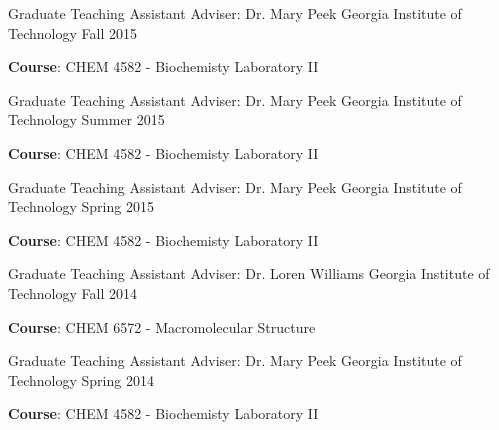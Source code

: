 \begin{cventries}
  \cventry
    {Graduate Teaching Assistant} %
    {Adviser: Dr. Mary Peek} %
    {Georgia Institute of Technology} %
    {Fall 2015} %
    {
      \begin{cvitems} %
        \item {\textbf{Course}: CHEM 4582 - Biochemisty Laboratory II}
      \end{cvitems}
    }

  \cventry
    {Graduate Teaching Assistant} %
    {Adviser: Dr. Mary Peek} %
    {Georgia Institute of Technology} %
    {Summer 2015} %
    {
      \begin{cvitems} %
        \item {\textbf{Course}: CHEM 4582 - Biochemisty Laboratory II}
      \end{cvitems}
    }

  \cventry
    {Graduate Teaching Assistant} %
    {Adviser: Dr. Mary Peek} %
    {Georgia Institute of Technology} %
    {Spring 2015} %
    {
      \begin{cvitems} %
        \item {\textbf{Course}: CHEM 4582 - Biochemisty Laboratory II}
      \end{cvitems}
    }

  \cventry
    {Graduate Teaching Assistant} %
    {Adviser: Dr. Loren Williams} %
    {Georgia Institute of Technology} %
    {Fall 2014} %
    {
      \begin{cvitems} %
        \item {\textbf{Course}: CHEM 6572 - Macromolecular Structure}
      \end{cvitems}
    }

  \cventry
    {Graduate Teaching Assistant} %
    {Adviser: Dr. Mary Peek} %
    {Georgia Institute of Technology} %
    {Spring 2014} %
    {
      \begin{cvitems} %
        \item {\textbf{Course}: CHEM 4582 - Biochemisty Laboratory II}
      \end{cvitems}
    }


\end{cventries}

